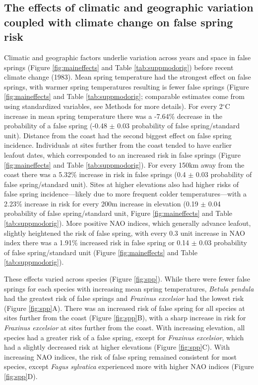 \documentclass{article}\usepackage[]{graphicx}\usepackage[]{color}
\begin{document}

\subsection*{The effects of climatic and geographic variation coupled with climate change on false spring risk}
Climatic and geographic factors underlie variation across years and space in false springs (Figure \ref{fig:maineffects} and Table \ref{tab:suppmodorig}) before recent climate change (1983). Mean spring temperature had the strongest effect on false springs, with warmer spring temperatures resulting is fewer false springs (Figure \ref{fig:maineffects} and Table \ref{tab:suppmodorig}; comparable estimates come from using standardized variables, see Methods for more details). For every 2$^{\circ}$C increase in mean spring temperature there was a -7.64\% decrease in the probability of a false spring (-0.48 $\pm$ 0.03 probability of false spring/standard unit). Distance from the coast had the second biggest effect on false spring incidence. Individuals at sites further from the coast tended to have earlier leafout dates, which corresponded to an increased risk in false springs (Figure \ref{fig:maineffects} and Table \ref{tab:suppmodorig}). For every 150km away from the coast there was a 5.32\% increase in risk in false springs (0.4 $\pm$ 0.03 probability of false spring/standard unit). Sites at higher elevations also had higher risks of false spring incidence---likely due to more frequent colder temperatures---with a 2.23\% increase in risk for every 200m increase in elevation (0.19 $\pm$ 0.04 probability of false spring/standard unit, Figure \ref{fig:maineffects} and Table \ref{tab:suppmodorig}). More positive NAO indices, which generally advance leafout, slightly heightened the risk of false spring, with every 0.3 unit increase in NAO index there was a 1.91\% increased risk in false spring or 0.14 $\pm$ 0.03 probability of false spring/standard unit (Figure \ref{fig:maineffects} and Table \ref{tab:suppmodorig}).  

These effects varied across species (Figure \ref{fig:spp}). While there were fewer false springs for each species with increasing mean spring temperatures,  \textit{Betula pendula} had the greatest risk of false springs and \textit{Fraxinus excelsior} had the lowest risk (Figure \ref{fig:spp}A). There was an increased risk of false spring for all species at sites further from the coast (Figure \ref{fig:spp}B), with a sharp increase in risk for \textit{Fraxinus excelsior} at sites further from the coast. With increasing elevation, all species had a greater risk of a false spring, except for \textit{Fraxinus excelsior}, which had a slightly decreased risk at higher elevations (Figure \ref{fig:spp}C).  With increasing NAO indices, the risk of false spring remained consistent for most species, except \textit{Fagus sylvatica} experienced more with higher NAO indices (Figure \ref{fig:spp}D). 
\end{document}

